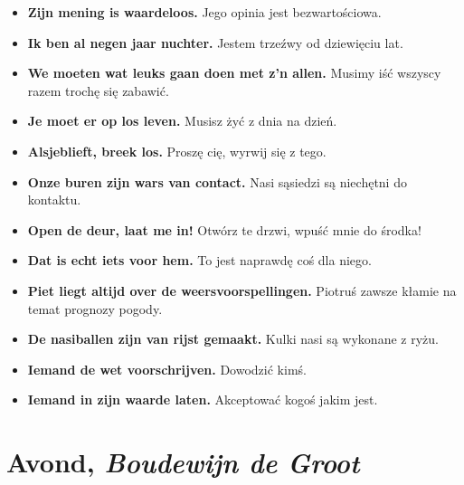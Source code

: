 \documentclass[
]{book}
\providecommand{\tightlist}{%
  \setlength{\itemsep}{0pt}\setlength{\parskip}{0pt}}
\begin{document}
\begin{itemize}
\tightlist
\item
  \textbf{Zijn mening is waardeloos.} Jego opinia jest bezwartościowa.\\
\item
  \textbf{Ik ben al negen jaar nuchter.} Jestem trzeźwy od dziewięciu lat.\\
\item
  \textbf{We moeten wat leuks gaan doen met z'n allen.} Musimy iść wszyscy razem trochę się zabawić.\\
\item
  \textbf{Je moet er op los leven.} Musisz żyć z dnia na dzień.\\
\item
  \textbf{Alsjeblieft, breek los.} Proszę cię, wyrwij się z tego.\\
\item
  \textbf{Onze buren zijn wars van contact.} Nasi sąsiedzi są niechętni do kontaktu.\\
\item
  \textbf{Open de deur, laat me in!} Otwórz te drzwi, wpuść mnie do środka!\\
\item
  \textbf{Dat is echt iets voor hem.} To jest naprawdę coś dla niego.\\
\item
  \textbf{Piet liegt altijd over de weersvoorspellingen.} Piotruś zawsze kłamie na temat prognozy pogody.\\
\item
  \textbf{De nasiballen zijn van rijst gemaakt.} Kulki nasi są wykonane z ryżu.\\
\item
  \textbf{Iemand de wet voorschrijven.} Dowodzić kimś.\\
\item
  \textbf{Iemand in zijn waarde laten.} Akceptować kogoś jakim jest.
\end{itemize}

\hypertarget{Avond}{%
\section{\texorpdfstring{Avond, \emph{Boudewijn de Groot}}{Avond, Boudewijn de Groot}}\label{Avond}}
\end{document}
